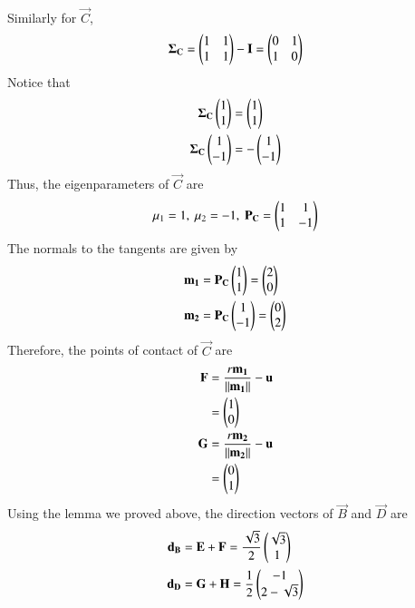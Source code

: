 \documentclass[journal,12pt,twocolumn]{IEEEtran}
\begin{document}
\begin{enumerate}
\begin{align}
    \end{align}
    Similarly for $\vec{C}$,
    \begin{align}
        \mathbf{\Sigma_C} = \begin{pmatrix}1&1\\1&1\end{pmatrix} - \mathbf{I} = \begin{pmatrix}0&1\\1&0\end{pmatrix}
    \end{align}
    Notice that
    \begin{align}
        \mathbf{\Sigma_C}\begin{pmatrix}1\\1\end{pmatrix} &= \begin{pmatrix}1\\1\end{pmatrix} \\
        \mathbf{\Sigma_C}\begin{pmatrix}1\\-1\end{pmatrix} &= -\begin{pmatrix}1\\-1\end{pmatrix} \\
    \end{align}
    Thus, the eigenparameters of $\vec{C}$ are
    \begin{align}
        \mu_1 = 1,\ \mu_2 = -1,\ \mathbf{P_C} = \begin{pmatrix}1&1\\1&-1\end{pmatrix}
    \end{align}
    The normals to the tangents are given by
    \begin{align}
        \mathbf{m_1} &= \mathbf{P_C}\begin{pmatrix}1\\1\end{pmatrix} = \begin{pmatrix}2\\0\end{pmatrix} \\ 
        \mathbf{m_2} &= \mathbf{P_C}\begin{pmatrix}1\\-1\end{pmatrix} = \begin{pmatrix}0\\2\end{pmatrix}
    \end{align}
    Therefore, the points of contact of $\vec{C}$ are
    \begin{align}
        \mathbf{F} &= \frac{r\mathbf{m_1}}{\left\lVert\mathbf{m_1}\right\rVert} - \mathbf{u} \\
                &= \begin{pmatrix}1\\0\end{pmatrix} \label{eq:poc-f} \\
        \mathbf{G} &= \frac{r\mathbf{m_2}}{\left\lVert\mathbf{m_2}\right\rVert} - \mathbf{u} \\
                &= \begin{pmatrix}0\\1\end{pmatrix} \label{eq:poc-g}
    \end{align}
    Using the lemma we proved above, the direction vectors of $\vec{B}$ and 
    $\vec{D}$ are
    \begin{align}
        \vec{d_B} &= \vec{E} + \vec{F} = \frac{\sqrt{3}}{2}\myvec{\sqrt{3}\\1} \label{eq:d-B} \\
        \vec{d_D} &= \vec{G} + \vec{H} = \frac{1}{2}\myvec{-1\\2-\sqrt{3}} \label{eq:d-D}

\end{align}
\end{enumerate}
\end{document}
